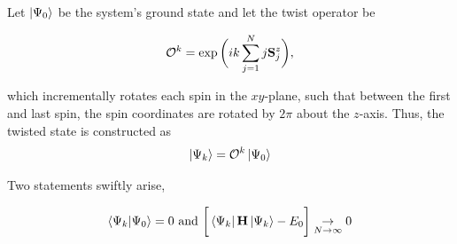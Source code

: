 \documentclass{homework}
\begin{document}
Let $\ket{\Psi_0}$ be the system's ground state and let the twist operator be 

$$
    \mathcal{O}^k = \exp \bigg(ik \sum_{j=1}^{N} j {\bf S}_j^z\bigg),
$$

which incrementally rotates each spin in the $xy$-plane, such that between the first and last spin, the spin coordinates are rotated by $2\pi$ about the $z$-axis. Thus, the twisted state is constructed as 
$$
    \ket{\Psi_k} = \mathcal{O}^k \ket{\Psi_0}
$$

Two statements swiftly arise, 

\begin{lemma}
\label{HH_1_dimensional_twisted_state}
   \begin{equation}
       \bra{\Psi_k} \ket{\Psi_0} = 0 \textnormal{ and } \bigg[\bra{\Psi_k} {{\bf H}} \ket{\Psi_k} - E_0\bigg] \underset{N \rightarrow \infty}{\rightarrow} 0
 \end{equation}
\end{lemma}
\end{document}
